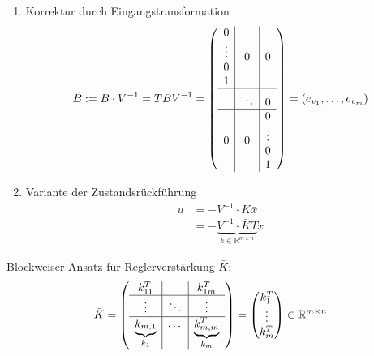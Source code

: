 \documentclass[ngerman]{tudscrreprt}
\begin{document}
\begin{enumerate}
\item Korrektur durch Eingangstransformation \begin{align*}\tilde B := \bar B \cdot V^{-1} = TBV^{-1}=
\left(\begin{array}{ c | c | c }
\begin{matrix} 0\\ \vdots\\ 0\\1 \end{matrix} & 0 & 0 \\ \hline & \ddots & 0 \\ \hline 0 & 0 & 
\begin{matrix} 0\\ \vdots\\ 0\\1 \end{matrix}
\end{array}
\right) = (e_{v_1}, \dots, e_{v_m})
\end{align*}
\item Variante der Zustandsrückführung \begin{align*}
u & = -V^{-1}\cdot \bar K \bar x \\ 
& = -\underbrace{V^{-1} \cdot \bar K T }_{ k \in \mathbb{R}^{m\times n}}x
\end{align*}
\end{enumerate}
Blockweiser Ansatz für Reglerverstärkung $\bar K :$ \begin{align*}
\bar K = \left(
\begin{array}{ c | c | c } 
k_{11}^T & & k_{1m}^T \\ \hline \vdots&\ddots& \vdots\\ \hline \underbrace{k_{m,1}}_{k_1} & \dots& \underbrace{k_{m,m}^T}_{k_m}
\end{array}
\right) = \begin{pmatrix} k_1^T\\ \vdots\\ k_m^T \end{pmatrix} \in \mathbb{R}^{m\times n}
\end{align*}
\end{document}
